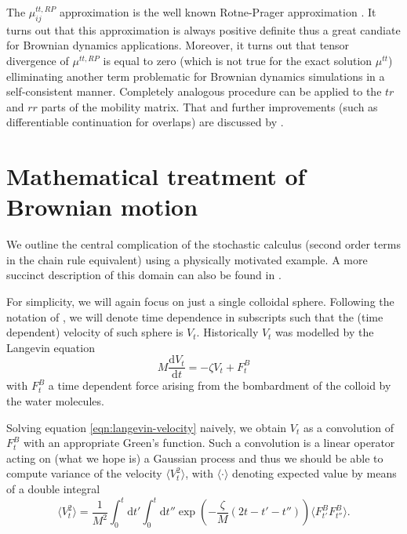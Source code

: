 \documentclass{doctoral}
\newcommand{\dd}{\mathrm{d}}
\newcommand{\mm}[1]{\bm{\mathsf{#1}}} %
\begin{document}
The $\mm{\mu}_{ij}^{tt,RP}$ approximation is the well known Rotne-Prager approximation \cite{Nagele_2013,Dhont_2008,Kim_2013}.
It turns out that this approximation is always positive definite thus a great candiate for Brownian dynamics applications.
Moreover, it turns out that tensor divergence of $\mm{\mu}^{tt,RP}$ is equal to zero (which is not true for the exact solution $\mm{\mu}^{tt}$) elliminating another term problematic for Brownian dynamics simulations in a self-consistent manner.
Completely analogous procedure can be applied to the $tr$ and $rr$ parts of the mobility matrix.
That and further improvements (such as differentiable continuation for overlaps) are discussed by \textcite{Zuk_2018}.

\section{Mathematical treatment of Brownian motion}
\label{sec:SDE}

We outline the central complication of the stochastic calculus (second order terms in the chain rule equivalent) using a physically motivated example.
A more succinct description of this domain can also be found in \textcite{Waszkiewicz_2023_pychastic}.

For simplicity, we will again focus on just a single colloidal sphere.
Following the notation of \textcite{Ottinger_2012}, we will denote time dependence in subscripts such that the (time dependent) velocity of such sphere is $V_t$.
Historically $V_t$ was modelled by the Langevin equation
\begin{equation}
    M \frac{\dd V_t}{\dd t} = - \zeta V_t + F^{B}_t \label{eqn:langevin-velocity}
\end{equation}
with $F^B_t$ a time dependent force arising from the bombardment of the colloid by the water molecules.

Solving equation \eqref{eqn:langevin-velocity} naively, we obtain $V_t$ as a convolution of $F_t^B$ with an appropriate Green's function.
Such a convolution is a linear operator acting on (what we hope is) a Gaussian process and thus we should be able to compute variance of the velocity $\langle V_t^2 \rangle$, with $\langle \cdot \rangle$ denoting expected value by means of a double integral
\begin{equation}
    \langle V_t^2 \rangle = \frac{1}{M^2} \int_0^t \dd t' \int_0^t \dd t'' \exp\left( - \frac{\zeta}{M} (2t - t' - t'') \right) \langle F_{t'}^B F_{t''}^B \rangle.
    \label{eqn:velocity-variance-integral}
\end{equation}
\end{document}
